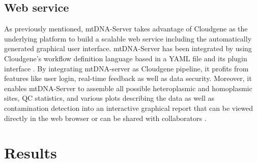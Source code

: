 \subsection{Web service}
\label{webservice}
As previously mentioned, mtDNA-Server takes advantage of Cloudgene as the underlying platform to build a scalable web service including the automatically generated graphical user interface. mtDNA-Server has been integrated by using Cloudgene’s workflow definition language based in a YAML file and its plugin interface \cite{Schonherr2012, Weissensteiner2016b}. By integrating mtDNA-server as Cloudgene pipeline, it profits from features like user login, real-time feedback as well as data security. Moreover, it enables mtDNA-Server to assemble all possible heteroplasmic and homoplasmic sites, QC statistics, and various plots describing the data as well as contamination detection into an interactive graphical report that can be viewed directly in the web browser or can be shared with collaborators  \cite{Weissensteiner2016b}.
\section{Results}
